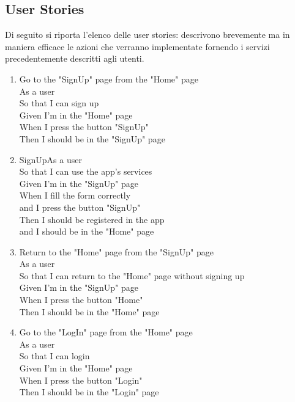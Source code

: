 \documentclass[Lau, binding=0.6cm]{sapthesis}
\begin{document}
\newpage
\subsection{User Stories}
Di seguito si riporta l'elenco delle user stories: descrivono brevemente ma in maniera efficace le azioni che verranno implementate fornendo i servizi precedentemente descritti agli utenti.\\

\begin{enumerate}
	\item Go to the "SignUp" page from the "Home" page\\
			As a user\\
			So that I can sign up\\
			Given I'm in the "Home" page\\
			When I press the button "SignUp"\\
			Then I should be in the "SignUp" page\\
	\item SignUpAs a user\\
			So that I can use the app's services\\
			Given I'm in the "SignUp" page\\
			When I fill the form correctly\\
			and I press the button "SignUp"\\
			Then I should be registered in the app\\
			and I should be in the "Home" page\\
	\item Return to the "Home" page from the "SignUp" page\\
			As a user\\
			So that I can return to the "Home" page without signing up\\
			Given I’m in the "SignUp" page\\
			When I press the button "Home"\\
			Then I should be in the "Home" page\\
	\item Go to the "LogIn" page from the "Home" page\\
			As a user\\
			So that I can login\\
			Given I’m in the "Home" page\\
			When I press the button "Login"\\
			Then I should be in the "Login" page\\

\end{enumerate}
\end{document}
